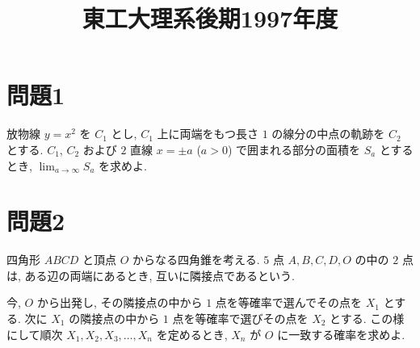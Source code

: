 \documentclass[unicode,12pt, a4paper]{ltjsarticle}%
\title{東工大理系後期1997年度}
\begin{document}
\maketitle
\section{問題1}
放物線 $y=x^2$ を $C_1$ とし, $C_1$ 上に両端をもつ長さ $1$ の線分の中点の軌跡を $C_2$ とする. $C_1$, $C_2$ および $2$ 直線 $x=\pm a$ ($a>0$) で囲まれる部分の面積を $S_a$ とするとき, $\lim_{a \to \infty} S_a$ を求めよ.


\section{問題2}
四角形 $ABCD$ と頂点 $O$ からなる四角錐を考える. $5$ 点 $A, B, C, D, O$ の中の $2$ 点は, ある辺の両端にあるとき, 互いに隣接点であるという.

今, $O$ から出発し, その隣接点の中から $1$ 点を等確率で選んでその点を $X_1$ とする. 次に $X_1$ の隣接点の中から $1$ 点を等確率で選びその点を $X_2$ とする. この様にして順次 $X_1, X_2, X_3, \dots, X_n$ を定めるとき, $X_n$ が $O$ に一致する確率を求めよ.
\end{document}
